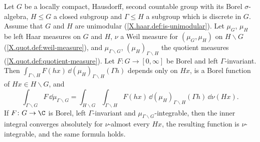 Let $G$ be a locally compact, Hausdorff, second countable group with its Borel $\sigma$-algebra, $H\le G$ a closed subgroup and
$\Gamma\le H$ a subgroup which is discrete in $G$. Assume that $G$ and $H$ are unimodular (\cref{X.haar.def:is-unimodular}). Let
$\mu_G$, $\mu_H$ be left Haar measures on $G$ and $H$, $\nu$ a Weil measure for $(\mu_G,\mu_H)$ on $H\backslash G$
(\cref{X.quot.def:weil-measure}), and $\mu_{\Gamma\backslash G}$, $(\mu_H)_{\Gamma\backslash H}$ the quotient measures
(\cref{X.quot.def:quotient-measure}). Let $F\colon G\to[0,\infty]$ be Borel and left $\Gamma$-invariant. Then
$\int_{\Gamma\backslash H}F(hx)\,\dd(\mu_H)_{\Gamma\backslash H}(\Gamma h)$ depends only on $Hx$, is a Borel function of $Hx\in H\backslash G$, and
\[
  \int_{\Gamma\backslash G}F\,\dd\mu_{\Gamma\backslash G}=\int_{H\backslash G}\int_{\Gamma\backslash H}F(hx)\,\dd(\mu_H)_{\Gamma\backslash H}(\Gamma h)\,\dd\nu(Hx).
\]
If $F\colon G\to\C$ is Borel, left $\Gamma$-invariant and $\mu_{\Gamma\backslash G}$-integrable, then the inner integral converges absolutely for
$\nu$-almost every $Hx$, the resulting function is $\nu$-integrable, and the same formula holds.
